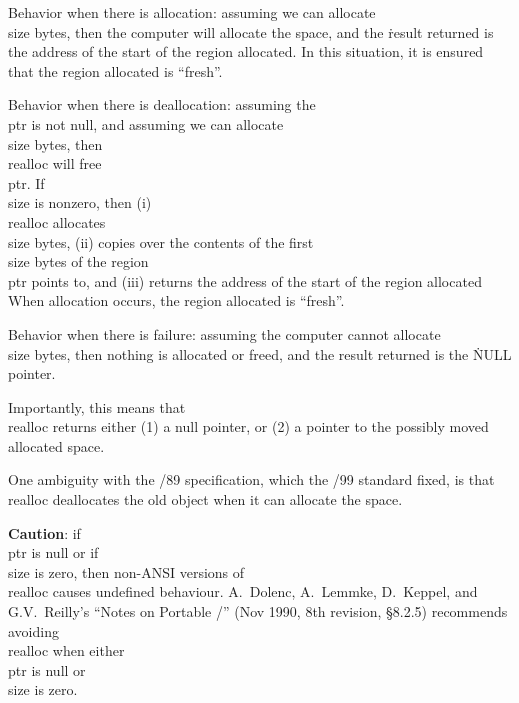  Behavior when there is allocation: assuming we can
allocate \\{size} bytes, then the computer will allocate the space,
and the \.{result} returned is the address of the start of the region
allocated. In this situation, it is ensured that the region allocated
is ``fresh''.

 Behavior when there is deallocation: assuming
the \\{ptr} is not null, and assuming we can allocate \\{size} bytes,
then \\{realloc} will free \\{ptr}. If \\{size} is nonzero,
then (i) \\{realloc} allocates \\{size} bytes, (ii) copies over the
contents of the first \\{size} bytes of the region \\{ptr} points to,
and (iii) returns the address of the start of the region allocated
When allocation occurs, the region allocated is ``fresh''.

 Behavior when there is failure: assuming the computer
cannot allocate \\{size} bytes, then nothing is allocated or freed,
and the result returned is the \.{NULL} pointer.

\medskip

Importantly, this means that \\{realloc} returns either (1) a null
pointer, or (2) a pointer to the possibly moved allocated space.

One ambiguity with the \CEE/89 specification, which the \CEE/99
standard fixed, is that \\{realloc} deallocates the old object when it
can allocate the space.

{\bf Caution}: if \\{ptr} is null or if \\{size} is zero, then
non-ANSI versions of \\{realloc} causes undefined behaviour.
A.~Dolenc, A.~Lemmke, D.~Keppel, and G.V.~Reilly's
``Notes on Portable \CEE/'' (Nov 1990, 8th revision, \S8.2.5)
recommends avoiding \\{realloc} when either \\{ptr} is null
or \\{size} is zero.

\fi

